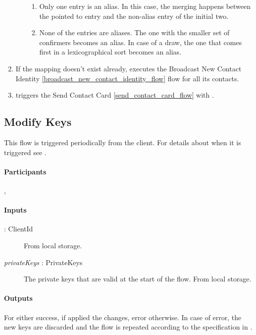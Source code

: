 \documentclass[a4paper,10pt]{article}
\newcommand{\privateKeys}{\emph{privateKeys}}
\newcommand{\identity}[1]{\parenthesize{identity}{#1}}
\begin{document}
\begin{enumerate}[resume]
\begin{enumerate}
\begin{enumerate}
    \item Only one entry is an alias. In this case, the merging happens between the pointed to entry and the non-alias entry of the initial two.
    \item None of the entries are aliases. The one with the smaller set of confirmers becomes an alias. In case of a draw, the one that comes first in a lexicographical sort 
becomes an alias.
  \end {enumerate}
 \end{enumerate}
 \item If the mapping doesn't exist already,  executes the Broadcast New Contact Identity \ref{broadcast_new_contact_identity_flow} flow for all its contacts.
 \item {} triggers the Send Contact Card \ref{send_contact_card_flow} with .
\end{enumerate}

\subsection{Modify Keys}
\label{modify_keys_flow}
This flow is triggered periodically from the client. For details about when it is triggered see \cite{crypto_spec}.

\paragraph{Participants} , \Server{}

\paragraph{Inputs}
\SpecialItem
\begin{description}
 \item[\identity{A} : ClientId] From  local storage.
 \item[\privateKeys{} : PrivateKeys] The private keys that are valid at the start of the flow. From  local storage.
\end{description}

\paragraph{Outputs}
For  either success, if \Server{} applied the changes, error otherwise. In case of error, the new keys are discarded and the flow is repeated according to the 
specification in \cite{crypto_spec}.
\end{document}

